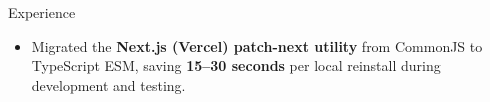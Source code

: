 \documentclass{resume}
\begin{document}
\begin{experienceSection}{Experience}
    \experienceItem[
      company={\textbf{Next.js} | Remote | Contributor},
        location={},
        position={},
        duration={July 2025 - May 2026}
    ]

    \begin{itemize}
        \itemsep -6pt {}
        \item Migrated the \textbf{Next.js (Vercel) patch-next utility} from CommonJS to TypeScript ESM, saving \textbf{15--30 seconds} per local reinstall during development and testing.

    \end{itemize}

\end{experienceSection}
\end{document}
